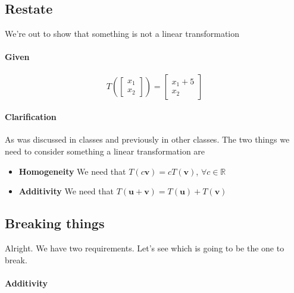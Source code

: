 \documentclass{article}
\begin{document}
        \subsection{Restate}
            We're out to show that something is not a linear transformation
        \paragraph{Given}
            \[
                T(\begin{bmatrix}x_1\\x_2\end{bmatrix})
                =
                \begin{bmatrix}x_1+5\\x_2\end{bmatrix}
            \]
        \paragraph{Clarification}
            As was discussed in classes and previously in other classes. The two things
            we need to consider something a linear transformation are
            \begin{itemize}
                \item \textbf{Homogeneity} We need that $T(c\mathbf{v})=cT(\mathbf{v})$,
                $\forall{c}\in\mathbb{R}$
                \item \textbf{Additivity} We need that $T(\mathbf{u}+\mathbf{v})=T(\mathbf{u})+T(\mathbf{v})$
            \end{itemize}
        \subsection{Breaking things}
            Alright. We have two requirements. Let's see which is going
            to be the one to break.
            \paragraph{Additivity}
                
\end{document}
